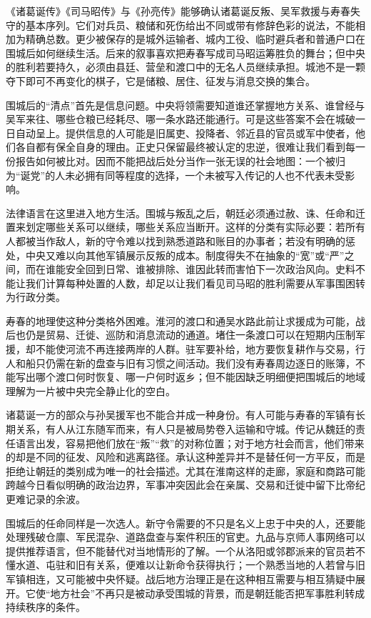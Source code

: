 《诸葛诞传》《司马昭传》与《孙亮传》能够确认诸葛诞反叛、吴军救援与寿春失守的基本序列。它们对兵员、粮储和死伤给出不同或带有修辞色彩的说法，不能相加为精确总数。更少被保存的是城外运输者、城内工役、临时避兵者和普通户口在围城后如何继续生活。后来的叙事喜欢把寿春写成司马昭运筹胜负的舞台；但中央的胜利若要持久，必须由县廷、营垒和渡口中的无名人员继续承担。城池不是一颗夺下即可不再变化的棋子，它是储粮、居住、征发与消息交换的集合。

围城后的“清点”首先是信息问题。中央将领需要知道谁还掌握地方关系、谁曾经与吴军来往、哪些仓粮已经耗尽、哪一条水路还能通行。可是这些答案不会在城破一日自动呈上。提供信息的人可能是旧属吏、投降者、邻近县的官员或军中使者，他们各自都有保全自身的理由。正史只保留最终被认定的忠逆，很难让我们看到每一份报告如何被比对。因而不能把战后处分当作一张无误的社会地图：一个被归为“诞党”的人未必拥有同等程度的选择，一个未被写入传记的人也不代表未受影响。

法律语言在这里进入地方生活。围城与叛乱之后，朝廷必须通过赦、诛、任命和迁置来划定哪些关系可以继续，哪些关系应当断开。这样的分类有实际必要：若所有人都被当作敌人，新的守令难以找到熟悉道路和账目的办事者；若没有明确的惩处，中央又难以向其他军镇展示反叛的成本。制度得失不在抽象的“宽”或“严”之间，而在谁能安全回到日常、谁被排除、谁因此转而害怕下一次政治风向。史料不能让我们计算每种处置的人数，却足以让我们看见司马昭的胜利需要从军事围困转为行政分类。

寿春的地理使这种分类格外困难。淮河的渡口和通吴水路此前让求援成为可能，战后也仍是贸易、迁徙、巡防和消息流动的通道。堵住一条渡口可以在短期内压制军援，却不能使河流不再连接两岸的人群。驻军要补给，地方要恢复耕作与交易，行人和船只仍需在新的盘查与旧有习惯之间活动。我们没有寿春周边逐日的账簿，不能写出哪个渡口何时恢复、哪一户何时返乡；但不能因缺乏明细便把围城后的地域理解为一片被中央完全静止化的空白。

诸葛诞一方的部众与孙吴援军也不能合并成一种身份。有人可能与寿春的军镇有长期关系，有人从江东随军而来，有人只是被局势卷入运输和守城。传记从魏廷的责任语言出发，容易把他们放在“叛”“救”的对称位置；对于地方社会而言，他们带来的却是不同的征发、风险和逃离路径。承认这种差异并不是替任何一方平反，而是拒绝让朝廷的类别成为唯一的社会描述。尤其在淮南这样的走廊，家庭和商路可能跨越今日看似明确的政治边界，军事冲突因此会在亲属、交易和迁徙中留下比帝纪更难记录的余波。

围城后的任命同样是一次选人。新守令需要的不只是名义上忠于中央的人，还要能处理残破仓廪、军民混杂、道路盘查与案件积压的官吏。九品与京师人事网络可以提供推荐语言，但不能替代对当地情形的了解。一个从洛阳或邻郡派来的官员若不懂水道、屯驻和旧有关系，便难以让新命令获得执行；一个熟悉当地的人若曾与旧军镇相连，又可能被中央怀疑。战后地方治理正是在这种相互需要与相互猜疑中展开。它使“地方社会”不再只是被动承受围城的背景，而是朝廷能否把军事胜利转成持续秩序的条件。

